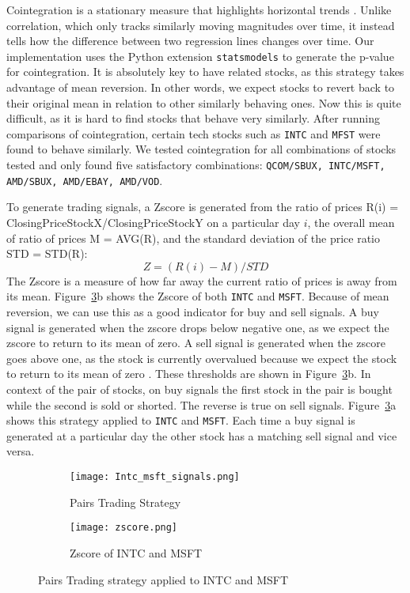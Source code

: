 \documentclass[../thesis.tex]{subfiles}
\begin{document}
Cointegration is a stationary measure that highlights horizontal trends \cite{Gatev2006}. Unlike correlation, which only tracks similarly moving magnitudes over time, it instead tells how the difference between two regression lines changes over time. Our implementation uses the Python extension \texttt{statsmodels} to generate the p-value for cointegration. It is absolutely key to have related stocks, as this strategy takes advantage of mean reversion. In other words, we expect stocks to revert back to their original mean in relation to other similarly behaving ones. Now this is quite difficult, as it is hard to find stocks that behave very similarly. After running comparisons of cointegration, certain tech stocks such as \texttt{INTC} and \texttt{MFST} were found to behave similarly. We tested cointegration for all combinations of stocks tested and only found five satisfactory combinations: \texttt{QCOM/SBUX, INTC/MSFT, AMD/SBUX, AMD/EBAY, AMD/VOD}. 

To generate trading signals, a Zscore is generated from the ratio of prices R(i) = ClosingPriceStockX/ClosingPriceStockY on a particular day $i$, the overall mean of ratio of prices M = AVG(R), and the standard deviation of the price ratio STD = STD(R): \[ Z = (R(i) - M)/STD\] The Zscore is a measure of how far away the current ratio of prices is away from its mean. Figure~\ref{PAIRSfigure}b shows the Zscore of both \texttt{INTC} and \texttt{MSFT}. Because of mean reversion, we can use this as a good indicator for buy and sell signals. A buy signal is generated when the zscore drops below negative one, as we expect the zscore to return to its mean of zero. A sell signal is generated when the zscore goes above one, as the stock is currently overvalued because we expect the stock to return to its mean of zero \cite{Fu2009}. These thresholds are shown in Figure~\ref{PAIRSfigure}b. In context of the pair of stocks, on buy signals the first stock in the pair is bought while the second is sold or shorted. The reverse is true on sell signals. Figure~\ref{PAIRSfigure}a shows this strategy applied to \texttt{INTC} and \texttt{MSFT}. Each time a buy signal is generated at a particular day the other stock has a matching sell signal and vice versa.

\begin{figure}[h]
\centering
\begin{subfigure}[t]{0.48\textwidth}
\texttt{[image: Intc\_msft\_signals.png]}
\caption{Pairs Trading Strategy  \label{overflow}}
\end{subfigure}
\begin{subfigure}[t]{0.48\textwidth}
\texttt{[image: zscore.png]}
\caption{Zscore of INTC and  MSFT \label{overflow}}
\end{subfigure}

\caption{Pairs Trading strategy applied to INTC and MSFT  \label{overflow}}
\label{PAIRSfigure}
\end{figure}
\end{document}
